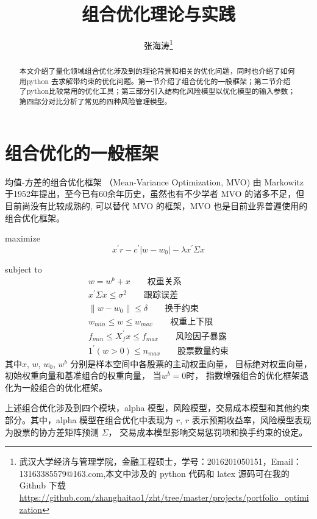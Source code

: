 \documentclass[UTF8,11pt]{ctexart}
\title{组合优化理论与实践}
\author{张海涛\thanks{武汉大学经济与管理学院，金融工程硕士，学号：2016201050151，Email：13163385579@163.com,本文中涉及的 python 代码和 latex 源码可在我的 Github 下载 \href{https://github.com/zhanghaitao1/zht/tree/master/projects/portfolio_optimization}{https://github.com/zhanghaitao1/zht/tree/master/projects/portfolio\_optimization}}}
\begin{document}
\maketitle

\begin{abstract}
本文介绍了量化领域组合优化涉及到的理论背景和相关的优化问题，同时也介绍了如何用python 去求解带约束的优化问题。第一节介绍了组合优化的一般框架；第二节介绍了python比较常用的优化工具；第三部分引入结构化风险模型以优化模型的输入参数；第四部分对比分析了常见的四种风险管理模型。
\end{abstract}


\newpage

\section{组合优化的一般框架}\label{section:kuangjia}

均值-方差的组合优化框架 （Mean-Variance Optimization, MVO) 由 Markowitz 于1952年提出，至今已有60余年历史，虽然也有不少学者 MVO 的诸多不足，但目前尚没有比较成熟的, 可以替代 MVO 的框架，MVO 也是目前业界普遍使用的组合优化框架。

maximize
\begin{equation}
x^\prime r - c^\prime|w-w_0|-\lambda x^\prime \Sigma x
\end{equation}

subject to
\begin{gather}
w=w^b+x                                 \qquad \mbox{权重关系}\\
x^\prime \Sigma x \le \sigma^2          \qquad \mbox{跟踪误差}\\
\lVert w-w_0 \rVert \le \delta          \qquad \mbox{换手约束}\\
w_{min}\le w \le w_{max}                \qquad \mbox{权重上下限}\\
f_{min} \le X_f^\prime x \le f_{max}    \qquad \mbox{风险因子暴露}\\
1^\prime (w>0) \le n_{max}              \qquad \mbox{股票数量约束}
\end{gather}
其中$x$, $w$, $w_0$, $w^b$ 分别是样本空间中各股票的主动权重向量， 目标绝对权重向量， 初始权重向量和基准组合的权重向量， 当$w^b=0$时， 指数增强组合的优化框架退化为一般组合的优化框架。

上述组合优化涉及到四个模块，alpha 模型，风险模型，交易成本模型和其他约束部分。其中，alpha 模型在组合优化中表现为 $r$, $r$ 表示预期收益率，风险模型表现为股票的协方差矩阵预测 $\Sigma$， 交易成本模型影响交易惩罚项和换手约束的设定。
\end{document}
